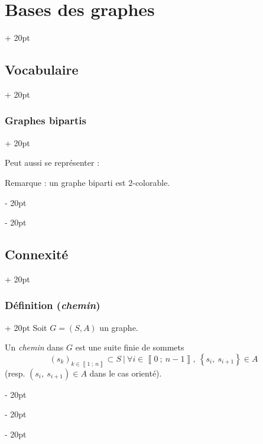 \documentclass[a4paper, 12pt, twoside]{article}
\newcommand{\nset}[2]{\left\llbracket #1\ ;\ #2 \right\rrbracket}
\newcommand{\set}[1]{\left\{ #1 \right\}}
\newcommand{\ind}[1][20pt]{\advance\leftskip + #1}
\newcommand{\deind}[1][20pt]{\advance\leftskip - #1}
\newenvironment{indt}[2][20pt]{#2 \par \ind[#1]}{\par \deind} %
\begin{document}
\begin{indt}{\section{Bases des graphes}}
\begin{indt}{\subsection{Vocabulaire}}
\begin{indt}{\subsubsection{Graphes bipartis}}
\begin{center}
\begin{tikzpicture}
                    \end{tikzpicture}
                \end{center}
                
                Peut aussi se représenter :
                
                \begin{center}
                \end{center}
                
                Remarque : un graphe biparti est $2$-colorable.
            \end{indt}
        \end{indt}

        \vspace{12pt}
        
        \begin{indt}{\subsection{Connexité}}
            \begin{indt}{\subsubsection{Définition (\textit{chemin})}}
                Soit $G = (S, A)$ un graphe.

                Un \textit{chemin} dans $G$ est une suite finie de sommets
                \[
                    (s_k)_{k \in \nset 1 n} \subset S\ |\ \forall i \in \nset{0}{n - 1},\ \set{s_i,\ s_{i + 1}} \in A
                \]
                (resp. $(s_i, \ s_{i + 1}) \in A$ dans le cas orienté).


\end{indt}
\end{indt}
\end{indt}
\end{document}
